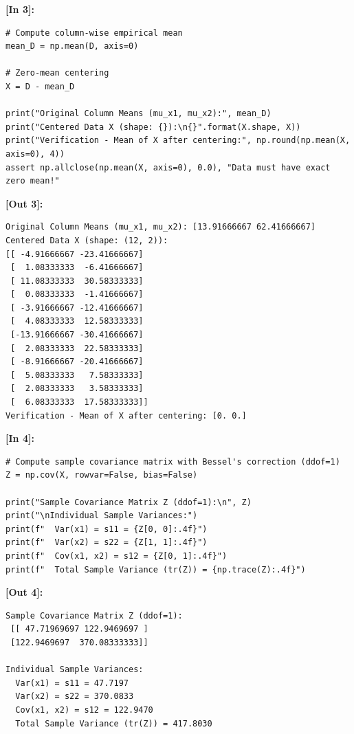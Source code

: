 \vspace{0.6em}
\noindent\textbf{\small [In 3]:}
\begin{lstlisting}[style=pycode]
# Compute column-wise empirical mean
mean_D = np.mean(D, axis=0)

# Zero-mean centering
X = D - mean_D

print("Original Column Means (mu_x1, mu_x2):", mean_D)
print("Centered Data X (shape: {}):\n{}".format(X.shape, X))
print("Verification - Mean of X after centering:", np.round(np.mean(X, axis=0), 4))
assert np.allclose(np.mean(X, axis=0), 0.0), "Data must have exact zero mean!"
\end{lstlisting}
\noindent\textbf{\small [Out 3]:}
\begin{lstlisting}[style=output]
Original Column Means (mu_x1, mu_x2): [13.91666667 62.41666667]
Centered Data X (shape: (12, 2)):
[[ -4.91666667 -23.41666667]
 [  1.08333333  -6.41666667]
 [ 11.08333333  30.58333333]
 [  0.08333333  -1.41666667]
 [ -3.91666667 -12.41666667]
 [  4.08333333  12.58333333]
 [-13.91666667 -30.41666667]
 [  2.08333333  22.58333333]
 [ -8.91666667 -20.41666667]
 [  5.08333333   7.58333333]
 [  2.08333333   3.58333333]
 [  6.08333333  17.58333333]]
Verification - Mean of X after centering: [0. 0.]
\end{lstlisting}

\vspace{0.6em}
\noindent\textbf{\small [In 4]:}
\begin{lstlisting}[style=pycode]
# Compute sample covariance matrix with Bessel's correction (ddof=1)
Z = np.cov(X, rowvar=False, bias=False)

print("Sample Covariance Matrix Z (ddof=1):\n", Z)
print("\nIndividual Sample Variances:")
print(f"  Var(x1) = s11 = {Z[0, 0]:.4f}")
print(f"  Var(x2) = s22 = {Z[1, 1]:.4f}")
print(f"  Cov(x1, x2) = s12 = {Z[0, 1]:.4f}")
print(f"  Total Sample Variance (tr(Z)) = {np.trace(Z):.4f}")
\end{lstlisting}
\noindent\textbf{\small [Out 4]:}
\begin{lstlisting}[style=output]
Sample Covariance Matrix Z (ddof=1):
 [[ 47.71969697 122.9469697 ]
 [122.9469697  370.08333333]]

Individual Sample Variances:
  Var(x1) = s11 = 47.7197
  Var(x2) = s22 = 370.0833
  Cov(x1, x2) = s12 = 122.9470
  Total Sample Variance (tr(Z)) = 417.8030
\end{lstlisting}

